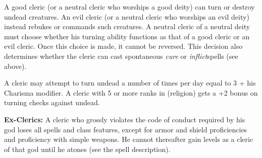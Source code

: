 A good cleric (or a neutral cleric who worships a good deity) can turn or destroy undead creatures. An evil cleric (or a neutral cleric who worships an evil deity) instead rebukes or commands such creatures. A neutral cleric of a neutral deity must choose whether his turning ability functions as that of a good cleric or an evil cleric. Once this choice is made, it cannot be reversed. This decision also determines whether the cleric can cast spontaneous \textit{cure} or \textit{inflict}spells (see above).

A cleric may attempt to turn undead a number of times per day equal to 3 + his Charisma modifier. A cleric with 5 or more ranks in  (religion) gets a +2 bonus on turning checks against undead.

\textbf{Ex-Clerics:} A cleric who grossly violates the code of conduct required by his god loses all spells and class features, except for armor and shield proficiencies and proficiency with simple weapons. He cannot thereafter gain levels as a cleric of that god until he atones (see the  spell description).
